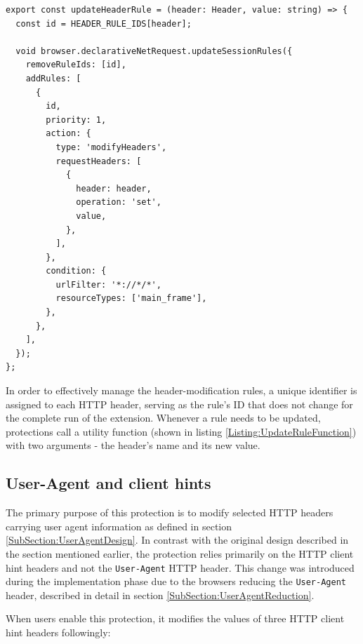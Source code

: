 \bigbreak

\begin{lstlisting}[caption={A utility function that removes the old header-modification rule and defines a new one with a new value.}, label={Listing:UpdateRuleFunction}]
export const updateHeaderRule = (header: Header, value: string) => {
  const id = HEADER_RULE_IDS[header];

  void browser.declarativeNetRequest.updateSessionRules({
    removeRuleIds: [id],
    addRules: [
      {
        id,
        priority: 1,
        action: {
          type: 'modifyHeaders',
          requestHeaders: [
            {
              header: header,
              operation: 'set',
              value,
            },
          ],
        },
        condition: {
          urlFilter: '*://*/*',
          resourceTypes: ['main_frame'],
        },
      },
    ],
  });
};

\end{lstlisting}

\medbreak

In order to effectively manage the header-modification rules, a unique identifier is assigned to each HTTP header, serving as the rule's ID that does not change for the complete run of the extension. Whenever a rule needs to be updated, protections call a utility function (shown in listing \ref{Listing:UpdateRuleFunction}) with two arguments - the header's name and its new value.

\subsection{User-Agent and client hints}

The primary purpose of this protection is to modify selected HTTP headers carrying user agent information as defined in section \ref{SubSection:UserAgentDesign}. In contrast with the original design described in the section mentioned earlier, the protection relies primarily on the HTTP client hint headers and not the \texttt{User-Agent} HTTP header. This change was introduced during the implementation phase due to the browsers reducing the \texttt{User-Agent} header, described in detail in section \ref{SubSection:UserAgentReduction}.

When users enable this protection, it modifies the values of three HTTP client hint headers followingly:

